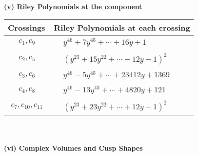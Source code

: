 \documentclass[1p]{elsarticle_modified}
\theoremstyle{definition}
\begin{document}
\newpage\renewcommand{\arraystretch}{1}
\flushleft \textbf{(v) Riley Polynomials at the component}\newline \\
\begin{tabular}{m{50pt}|m{274pt}}
Crossings & \hspace{64pt}Riley Polynomials at each crossing \\
\hline $$\begin{aligned}c_{1},c_{9}\end{aligned}$$&$\begin{aligned}
&y^{46}+7 y^{45}+\cdots+16 y+1
\end{aligned}$\\
\hline $$\begin{aligned}c_{2},c_{5}\end{aligned}$$&$\begin{aligned}
&(y^{23}+15 y^{22}+\cdots-12 y-1)^{2}
\end{aligned}$\\
\hline $$\begin{aligned}c_{3},c_{6}\end{aligned}$$&$\begin{aligned}
&y^{46}-5 y^{45}+\cdots+23412 y+1369
\end{aligned}$\\
\hline $$\begin{aligned}c_{4},c_{8}\end{aligned}$$&$\begin{aligned}
&y^{46}-13 y^{45}+\cdots+4820 y+121
\end{aligned}$\\
\hline $$\begin{aligned}c_{7},c_{10},c_{11}\end{aligned}$$&$\begin{aligned}
&(y^{23}+23 y^{22}+\cdots+12 y-1)^{2}
\end{aligned}$\\
\hline
\end{tabular}\\~\\
\newpage\flushleft \textbf{(vi) Complex Volumes and Cusp Shapes}
\end{document}
